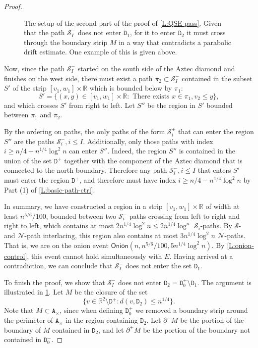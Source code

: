 \documentclass[10pt,a4paper]{amsart}
\newcommand{\R}{\mathbb{R}}
\newcommand{\cN}{\mathcal{N}}
\newcommand{\cS}{\mathcal{S}}
\renewcommand{\tt}[1]{{\mathtt{#1}}}
\begin{document}
\begin{proof}
        \begin{figure}
            \centering
    
            \caption{The setup of the second part of the proof of \cref{L:QSE-pass}. Given that the path $\mathcal S_I^-$ does not enter $\tt{D}_1$, for it to enter $\tt{D}_2$ it must cross through the boundary strip $M$ in a way that contradicts a parabolic drift estimate. One example of this is given above.}
            \label{fig:lemma542}
        \end{figure}
		
		Now, since the path $\cS_I^-$ started on the south side of the Aztec diamond and finishes on the west side, there must exist a path $\pi_2 \subset \cS_I^-$ contained in the subset $S'$ of the strip $[v_1, w_1] \times \R$ which is bounded below by $\pi_1$:
		$$
		S' = \{(x, y) \in [v_1, w_1] \times \R : \text{ There exists } x \in \pi_1, v_2 \le y \},
		$$
		and which crosses $S'$ from right to left. Let $S''$ be the region in $S'$ bounded between $\pi_1$ and $\pi_2$. 
		
		By the ordering on paths, the only paths of the form $\cS^\pm_i$ that can enter the region $S''$ are the paths $\cS^-_i, i \le I$. Additionally, only those paths with index $i \ge n/4 - n^{1/4} \log^2 n$ can enter $S''$.	Indeed, the region $S''$ is contained in the union of the set $\tt{D}^+$ together with the component of the Aztec diamond that is connected to the north boundary. Therefore any path $\cS^-_i, i \le I$ that enters $S'$ must enter the region $\tt{D}^+$, and therefore must have index $i \ge n/4 - n^{1/4} \log^2 n$ by Part (1) of \cref{L:basic-path-ctrl}. 
		
		In summary, we have constructed a region in a strip $[v_1, w_1] \times \R$ of width at least $n^{5/6}/100$, bounded between two $\cS_i^-$ paths crossing from left to right and right to left, which contains at most $2 n^{1/4} \log^2 n \le 2 n^{1/4} \log^n$ $\cS_i$-paths. By $\cS$- and $\cN$-path interlacing, this region also contains at most $3n^{1/4} \log^2 n$ $\cN$-paths. That is, we are on the onion event
		$
		\mathsf{Onion}(n, n^{5/6}/100, 5n^{1/4}\log^2 n).
		$
		By \cref{L:onion-control}, this event cannot hold simultaneously with $E$. Having arrived at a contradiction, we can conclude that $\cS_I^-$ does not enter the set $\tt{D}_1$.
		
		To finish the proof, we show that $\cS_I^-$ does not enter $
        \tt{D}_2 = \tt{D}^+_0 \setminus \tt{D}_1$. The argument is illustrated in \cref{fig:lemma542}. Let $M$ be the closure of the set
		$$
		\{v \in \R^2 \setminus \tt{D}^+ : d(v, \tt{D}_2) \le n^{1/4}\}.
		$$
		Note that $M \subset \tt{A}_\times$, since when defining $\tt{D}_0^+$ we removed a boundary strip around the perimeter of $\tt{A}_\times$ in the region containing $\tt{D}_2$. Let $\partial^- M$ be the portion of the boundary of $M$ contained in $\tt{D}_2$, and let $\partial^+ M$ be the portion of the boundary not contained in $\tt{D}_0^-$.
		

\end{proof}
\end{document}
